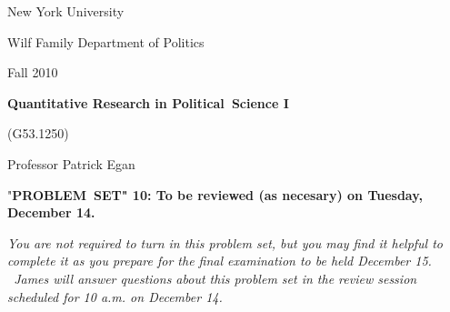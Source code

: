 \documentclass[11pt]{article}
\begin{document}
New York University

Wilf Family Department of Politics

Fall 2010

\begin{center}
{\large \textbf{Quantitative Research in Political\ Science I}}

(G53.1250)

Professor Patrick Egan

\bigskip

"\textbf{PROBLEM\ SET" 10: To be reviewed (as necesary) on Tuesday, December
14.}
\end{center}

\textit{You are not required to turn in this problem set, but you may find
it helpful to complete it as you prepare for the final examination to be
held December 15. \ James will answer questions about this problem set in
the review session scheduled for 10 a.m. on December 14.}
\end{document}
